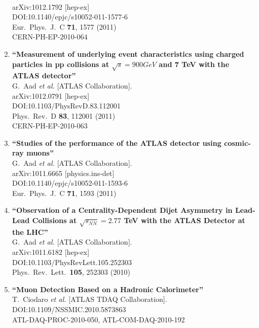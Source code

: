 \documentclass{article}
\begin{document}
\begin{enumerate}
  \\{}arXiv:1012.1792 [hep-ex]
  \\{}DOI:10.1140/epjc/s10052-011-1577-6
  \\{}Eur.\ Phys.\ J.\ C {\bf 71}, 1577 (2011)
  \\{}CERN-PH-EP-2010-064
\item%
{\bf ``Measurement of underlying event characteristics using charged particles in pp collisions at $\sqrt{s} = 900 GeV$ and 7 TeV with the ATLAS detector''}
  \\{}G.~Aad {\it et al.} [ATLAS Collaboration].
  \\{}arXiv:1012.0791 [hep-ex]
  \\{}DOI:10.1103/PhysRevD.83.112001
  \\{}Phys.\ Rev.\ D {\bf 83}, 112001 (2011)
  \\{}CERN-PH-EP-2010-063
\item%
{\bf ``Studies of the performance of the ATLAS detector using cosmic-ray muons''}
  \\{}G.~Aad {\it et al.} [ATLAS Collaboration].
  \\{}arXiv:1011.6665 [physics.ins-det]
  \\{}DOI:10.1140/epjc/s10052-011-1593-6
  \\{}Eur.\ Phys.\ J.\ C {\bf 71}, 1593 (2011)
\item%
{\bf ``Observation of a Centrality-Dependent Dijet Asymmetry in Lead-Lead Collisions at $\sqrt{s_{NN}}=2.77$ TeV with the ATLAS Detector at the LHC''}
  \\{}G.~Aad {\it et al.} [ATLAS Collaboration].
  \\{}arXiv:1011.6182 [hep-ex]
  \\{}DOI:10.1103/PhysRevLett.105.252303
  \\{}Phys.\ Rev.\ Lett.\  {\bf 105}, 252303 (2010)
\item%
{\bf ``Muon Detection Based on a Hadronic Calorimeter''}
  \\{}T.~Ciodaro {\it et al.} [ATLAS TDAQ Collaboration].
  \\{}DOI:10.1109/NSSMIC.2010.5873863
  \\{}ATL-DAQ-PROC-2010-050, ATL-COM-DAQ-2010-192


\end{enumerate}
\end{document}
